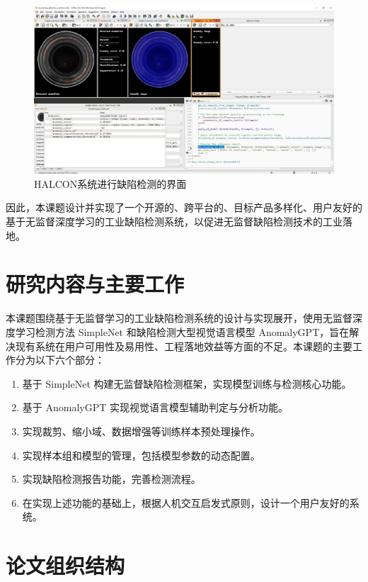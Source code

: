 \documentclass[
  ]{njuthesis}
\begin{document}
\begin{figure}[ht]
  \centering
  \includegraphics[width=\textwidth]{images/HALCON系统界面.png}
  \caption{HALCON系统进行缺陷检测的界面}
  \label{HALCON}
\end{figure}

因此，本课题设计并实现了一个开源的、跨平台的、目标产品多样化、用户友好的基于无监督深度学习的工业缺陷检测系统，以促进无监督缺陷检测技术的工业落地。

\section{研究内容与主要工作}

本课题围绕基于无监督学习的工业缺陷检测系统的设计与实现展开，使用无监督深度学习检测方法 SimpleNet 和缺陷检测大型视觉语言模型 AnomalyGPT，旨在解决现有系统在用户可用性及易用性、工程落地效益等方面的不足。本课题的主要工作分为以下六个部分：  

\begin{enumerate}
    \item 基于 SimpleNet 构建无监督缺陷检测框架，实现模型训练与检测核心功能。
    \item 基于 AnomalyGPT 实现视觉语言模型辅助判定与分析功能。
    \item 实现裁剪、缩小域、数据增强等训练样本预处理操作。
    \item 实现样本组和模型的管理，包括模型参数的动态配置。
    \item 实现缺陷检测报告功能，完善检测流程。
    \item 在实现上述功能的基础上，根据人机交互启发式原则，设计一个用户友好的系统。
\end{enumerate}

\section{论文组织结构}
\end{document}
